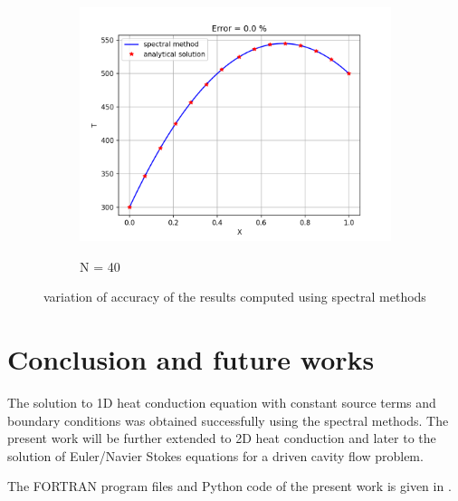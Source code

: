 \documentclass[conf]{new-aiaa}
\begin{document}
\begin{figure}[!htb]
\begin{subfigure}{0.45\textwidth}
        \includegraphics[width=\textwidth]{supportingFiles/output_N_40.png}
        \label{N_40}
        \caption{N = 40}
    \end{subfigure}
    \caption{variation of accuracy of the results computed using spectral methods}
    \label{results_figure}
\end{figure}

\section{Conclusion and future works}
The solution to 1D heat conduction equation with constant source terms and
boundary conditions was obtained successfully using the spectral methods.
The present work will be further extended to 2D heat conduction and later to
the solution of Euler/Navier Stokes equations for a driven cavity flow problem.

\par The FORTRAN program files and Python code of the present work is given in
.


\pagebreak
\end{document}
